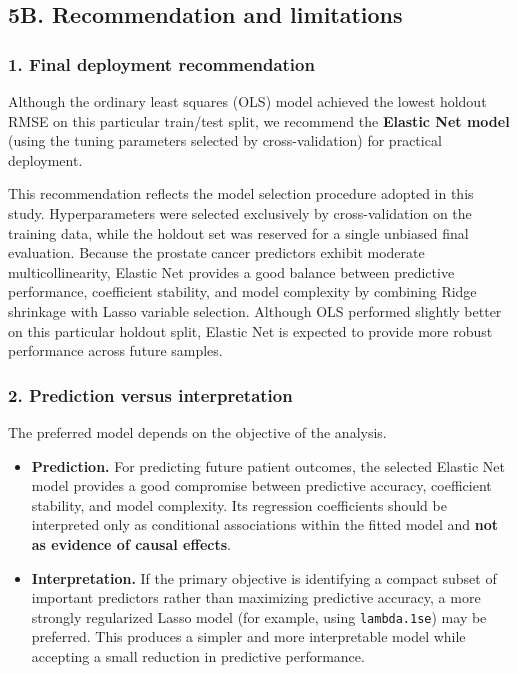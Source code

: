 \documentclass[
  11pt,
]{article}
\begin{document}
\subsection{5B. Recommendation and
limitations}\label{b.-recommendation-and-limitations}

\subsubsection{1. Final deployment
recommendation}\label{final-deployment-recommendation}

Although the ordinary least squares (OLS) model achieved the lowest
holdout RMSE on this particular train/test split, we recommend the
\textbf{Elastic Net model} (using the tuning parameters selected by
cross-validation) for practical deployment.

This recommendation reflects the model selection procedure adopted in
this study. Hyperparameters were selected exclusively by
cross-validation on the training data, while the holdout set was
reserved for a single unbiased final evaluation. Because the prostate
cancer predictors exhibit moderate multicollinearity, Elastic Net
provides a good balance between predictive performance, coefficient
stability, and model complexity by combining Ridge shrinkage with Lasso
variable selection. Although OLS performed slightly better on this
particular holdout split, Elastic Net is expected to provide more robust
performance across future samples.

\subsubsection{2. Prediction versus
interpretation}\label{prediction-versus-interpretation}

The preferred model depends on the objective of the analysis.

\begin{itemize}
\item
  \textbf{Prediction.} For predicting future patient outcomes, the
  selected Elastic Net model provides a good compromise between
  predictive accuracy, coefficient stability, and model complexity. Its
  regression coefficients should be interpreted only as conditional
  associations within the fitted model and \textbf{not as evidence of
  causal effects}.
\item
  \textbf{Interpretation.} If the primary objective is identifying a
  compact subset of important predictors rather than maximizing
  predictive accuracy, a more strongly regularized Lasso model (for
  example, using \texttt{lambda.1se}) may be preferred. This produces a
  simpler and more interpretable model while accepting a small reduction
  in predictive performance.
\end{itemize}
\end{document}
